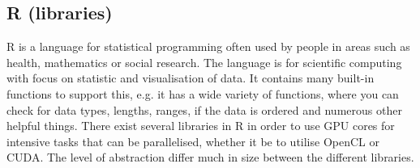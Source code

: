 \subsection{R (libraries)}
R is a language for statistical programming often used by people in areas such as health, mathematics or social research.
The language is for scientific computing with focus on statistic and visualisation of data.
It contains many built-in functions to support this, e.g. it has a wide variety of functions, where you can check for data types, lengths, ranges, if the data is ordered and numerous other helpful things.
There exist several libraries in R in order to use GPU cores for intensive tasks that can be parallelised, whether it be to utilise OpenCL or CUDA. 
The level of abstraction differ much in size between the different libraries. 
\citep{R_history,R_speed}

                            
